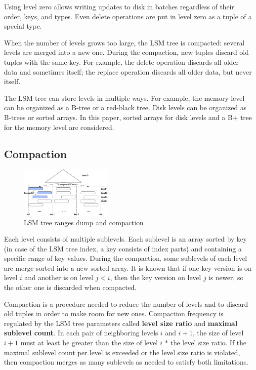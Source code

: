 \documentclass{vldb}
\begin{document}
Using level zero allows writing updates to disk in batches regardless of
their order, keys, and types. Even delete operations are put in level zero as a tuple of a
special type.

When the number of levels grows too large, the LSM tree is compacted: several levels are
merged into a new one. During the compaction, new tuples discard old tuples with the same
key. For example, the delete operation discards all older data and sometimes itself; the replace
operation discards all older data, but never itself.

The LSM tree can store levels in multiple ways. For example, the memory level can be
organized as a B-tree or a red-black tree. Disk levels can be organized as B-trees or sorted
arrays. In this paper, sorted arrays for disk levels and a B+ tree for the memory level
are considered.

\subsection{Compaction}
\begin{figure}
\centering
\includegraphics[width=0.4\textwidth]{compaction_schema}
\caption{LSM tree ranges dump and compaction}
\label{fig:compaction_schema}
\end{figure}
Each level consists of multiple sublevels. Each sublevel is an array sorted by
key (in case of the LSM tree index, a key consists of index parts) and
containing a specific range of key values. During the compaction, some sublevels of each
level are merge-sorted into a new sorted array. It is known that if one key
version is on level $i$ and another is on level $j < i$, then the key version on level
$j$ is newer, so the other one is discarded when compacted.

Compaction is a procedure needed to reduce the number of levels and to discard old tuples
in order to make room for new ones. Compaction frequency is regulated by the LSM tree
parameters called \textbf{level size ratio} and \textbf{maximal sublevel count}. In each pair of
neighboring levels $i$ and $i + 1$, the size of level $i + 1$ must at least be greater than
the size of level $i$ $*$ the level size ratio. If the maximal sublevel count per
level is exceeded or the level size ratio is violated, then compaction merges as many
sublevels as needed to satisfy both limitations.
\end{document}
